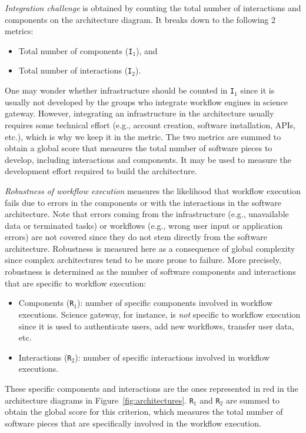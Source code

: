 \documentclass[preprint,3p,twocolumn]{elsarticle}
\begin{document}
\emph{Integration challenge} is obtained by counting the total number of
interactions and components on the architecture diagram. It breaks
down to the following 2 metrics:
\begin{itemize}[leftmargin=0cm,itemindent=0.35cm,itemsep=0cm]
\item Total number of components (\texttt{I$_1$}), and
\item Total number of interactions (\texttt{I$_2$}).
\end{itemize}
One may wonder whether infrastructure should be counted in
\texttt{I$_1$} since it is usually not developed by the groups who
integrate workflow engines in science gateway. However, integrating an
infrastructure in the architecture usually requires some technical
effort (e.g., account creation, software installation, APIs, etc.), which is
why we keep it in the metric. The two metrics are summed to obtain a
global score that measures the
total number of software pieces to develop, including interactions and
components. It may be used to measure the development effort required
to build the architecture.

\emph{Robustness of workflow execution} measures the likelihood that
workflow execution fails due to errors in the components or with the
interactions in the software architecture. Note that errors coming
from the infrastructure (e.g., unavailable data or terminated tasks)
or workflows (e.g., wrong user input or application errors) are not
covered since they do not stem directly from the software
architecture. Robustness is measured here as a consequence of global
complexity since complex architectures tend to be more prone to
failure. More precisely, robustness is determined as the number of
software components and interactions that are specific to workflow
execution:
\begin{itemize}[leftmargin=0cm,itemindent=0.35cm,itemsep=0cm]
\item Components (\texttt{R$_1$}): number of specific components
  involved in workflow executions. Science
gateway, for instance, is \emph{not} specific to workflow execution
since it is used to authenticate users, add new workflows, transfer
user data, etc.
\item Interactions (\texttt{R$_2$}): number of specific interactions
  involved in workflow executions.
\end{itemize}
These specific components and interactions are the ones represented in
red in the architecture diagrams in
Figure~\ref{fig:architectures}. \texttt{R$_1$} and \texttt{R$_2$} are
summed to obtain the global score for this criterion, which measures
the total number of software pieces that are specifically involved in
the workflow execution.
\end{document}
